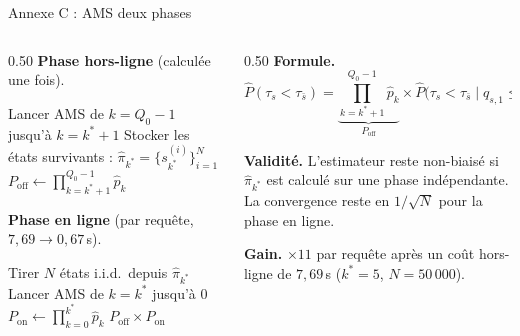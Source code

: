 \documentclass[10pt,aspectratio=169]{beamer}
\begin{document}
\begin{frame}{Annexe C : AMS deux phases}
\begin{columns}[T,onlytextwidth]
\begin{column}{0.50\textwidth}
\small
\textbf{Phase hors-ligne} (calculée une fois).
\begin{algorithmic}[1]
\State Lancer AMS de $k=Q_0-1$ jusqu'à $k=k^*+1$
\State Stocker les états survivants :
       $\hat\pi_{k^*}=\{s^{(i)}_{k^*}\}_{i=1}^{N}$
\State $P_\mathrm{off}\gets\prod_{k=k^*+1}^{Q_0-1}\hat p_k$
\end{algorithmic}

\vspace{1ex}
\textbf{Phase en ligne} (par requête, $7{,}69\to 0{,}67$\,s).
\begin{algorithmic}[1]
\State Tirer $N$ états i.i.d.\ depuis $\hat\pi_{k^*}$
\State Lancer AMS de $k=k^*$ jusqu'à $0$
\State $P_\mathrm{on}\gets\prod_{k=0}^{k^*}\hat p_k$
\State \Return $P_\mathrm{off}\times P_\mathrm{on}$
\end{algorithmic}
\end{column}
\begin{column}{0.50\textwidth}
\small
\textbf{Formule.}
\[
\hat P(\tau_s<\tau_{\bar s})=
\underbrace{\prod_{k=k^*+1}^{Q_0-1}\hat p_k}_{P_\mathrm{off}}
\times
\hat P\!\bigl(\tau_s<\tau_{\bar s}\mid q_{s,1}\le k^*\bigr).
\]

\textbf{Validité.} L'estimateur reste non-biaisé si $\hat\pi_{k^*}$ est calculé sur une phase indépendante. La convergence reste en $1/\sqrt N$ pour la phase en ligne.

\vspace{0.5ex}
\textbf{Gain.} ${\times}11$ par requête après un coût hors-ligne de $7{,}69$\,s ($k^*{=}5$, $N{=}50\,000$).
\end{column}
\end{columns}
\end{frame}
\end{document}
